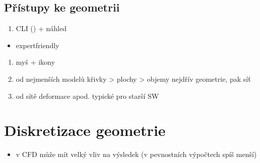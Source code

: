 \documentclass[letterpaper,10pt,czech]{sphinxmanual}
\begin{document}
\subsection{Přístupy ke geometrii}
\label{\detokenize{prednaska_23092022:pristupy-ke-geometrii}}\begin{enumerate}
%
\item {} 
\sphinxAtStartPar
CLI () + náhled

\end{enumerate}
\begin{itemize}
\item {} 
\sphinxAtStartPar
expert\sphinxhyphen{}friendly

\end{itemize}
\begin{enumerate}
%
\setcounter{enumi}{1}
\item {} 
\sphinxAtStartPar
myš + ikony

\item {} 
\sphinxAtStartPar
od nejmenších modelů
\sphinxhyphen{} křivky \sphinxhyphen{}\textgreater{} plochy \sphinxhyphen{}\textgreater{} objemy
\sphinxhyphen{} nejdřív geometrie, pak síť

\item {} 
\sphinxAtStartPar
od sítě
\sphinxhyphen{} deformace apod.
\sphinxhyphen{} typické pro starší SW

\end{enumerate}


\section{Diskretizace geometrie}
\label{\detokenize{prednaska_23092022:diskretizace-geometrie}}\begin{itemize}
\item {} 
\sphinxAtStartPar
v CFD může mít velký vliv na výsledek (v pevnostních výpočtech spíš menší)

\end{itemize}
\end{document}
